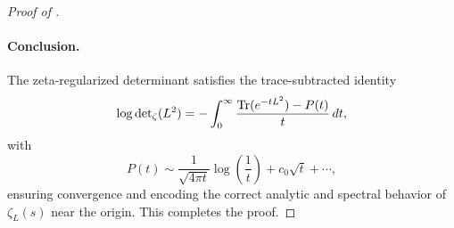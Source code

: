 \begin{proof}[Proof of ]
\paragraph{Conclusion.}
The zeta-regularized determinant satisfies the trace-subtracted identity
\[
\log \det\nolimits_\zeta(L^2) = -\int_0^\infty \frac{\operatorname{Tr}(e^{-t L^2}) - P(t)}{t} \, dt,
\]
with
\[
P(t) \sim \frac{1}{\sqrt{4\pi t}} \log\left(\frac{1}{t}\right) + c_0 \sqrt{t} + \cdots,
\]
ensuring convergence and encoding the correct analytic and spectral behavior of \( \zeta_L(s) \) near the origin. This completes the proof.
\end{proof}
